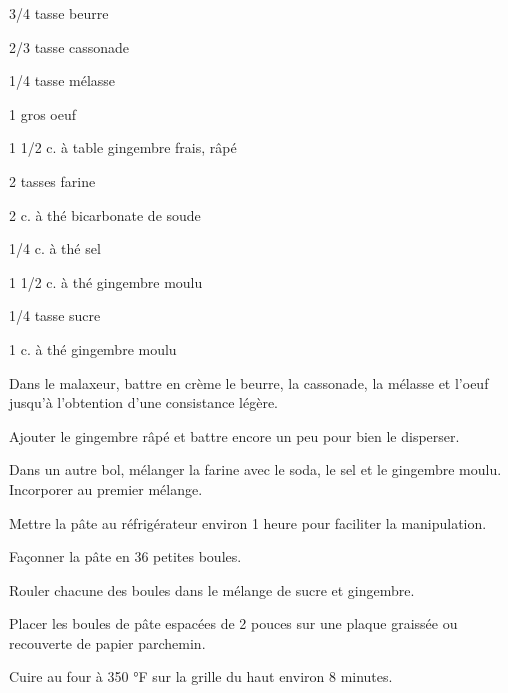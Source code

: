 



\totaltime{}


\begin{ingredients}
    \item 3/4 tasse beurre
    \item 2/3 tasse cassonade
    \item 1/4 tasse mélasse
    \item 1 gros oeuf
    \item 1 1/2 c. à table gingembre frais, râpé
    \item 2 tasses farine
    \item 2 c. à thé bicarbonate de soude
    \item 1/4 c. à thé sel
    \item 1 1/2 c. à thé gingembre moulu
    \\
    \item[] 
    \item 1/4 tasse sucre
    \item 1 c. à thé gingembre moulu
\end{ingredients}

\begin{steps}
    \item Dans le malaxeur, battre en crème le beurre, la cassonade, la mélasse et l'oeuf jusqu'à l'obtention d'une consistance légère.
    \item Ajouter le gingembre râpé et battre encore un peu pour bien le disperser.
    \item Dans un autre bol, mélanger la farine avec le soda, le sel et le gingembre moulu. Incorporer au premier mélange.
    \item Mettre la pâte au réfrigérateur environ 1 heure pour faciliter la manipulation.
    \item Façonner la pâte en 36 petites boules.
    \item Rouler chacune des boules dans le mélange de sucre et gingembre.
    \item Placer les boules de pâte espacées de 2 pouces sur une plaque graissée ou recouverte de papier parchemin.
    \item Cuire au four à 350 °F sur la grille du haut environ 8 minutes.
\end{steps}
